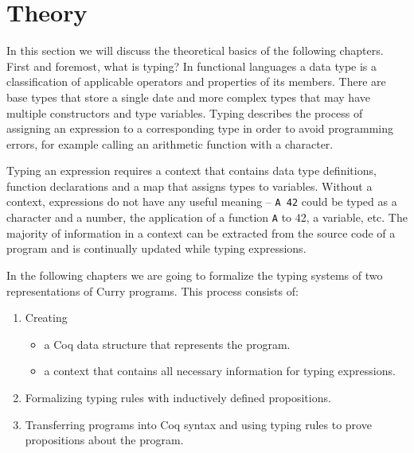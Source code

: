 \documentclass[paper = a4, fleqn, abstract=on, twoside]{scrreprt}
\newcommand{\coqinline}[1]{\texttt{#1}}
\begin{document}
\section{Theory}
\label{theory}
In this section we will discuss the theoretical basics of the following chapters. First and foremost, what is typing?
In functional languages a data type is a classification of applicable operators and properties of its members. There are base types that store a single date and more complex types that may have multiple constructors and type variables. Typing describes the process of assigning an expression to a corresponding type in order to avoid programming errors, for example calling an arithmetic function with a character.
\par \noindent
Typing an expression requires a context that contains data type definitions, function declarations and a map that assigns types to variables. Without a context, expressions do not have any useful meaning -- \coqinline{A 42} could be typed as a character and a number, the application of a function \coqinline{A} to 42, a variable, etc. The majority of information in a context can be extracted from the source code of a program and is continually updated while typing expressions.
\par \noindent
In the following chapters we are going to formalize the typing systems of two representations of Curry programs. This process consists of:
\begin{enumerate}
	\item Creating \begin{itemize}
		              \item a Coq data structure that represents the program.
		              \item a context that contains all necessary information for typing expressions.
		           \end{itemize}
	\item Formalizing typing rules with inductively defined propositions.
	\item Transferring programs into Coq syntax and using typing rules to prove propositions about the program.
\end{enumerate}
\end{document}
